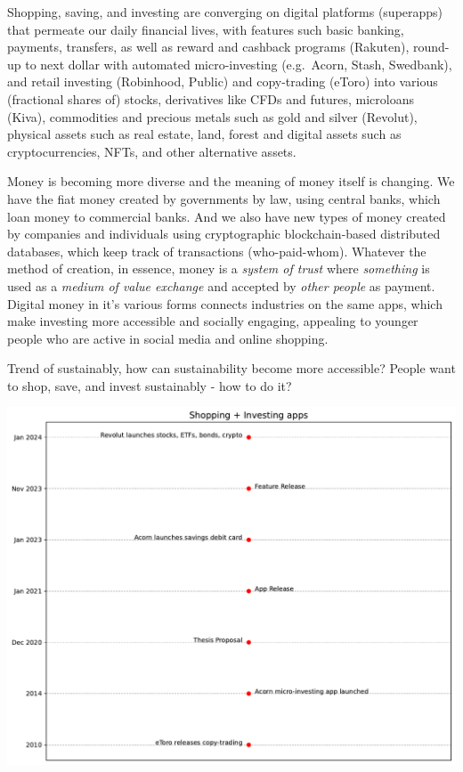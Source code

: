 \documentclass[
  letterpaper,
  DIV=11,
  numbers=noendperiod]{scrartcl}
\begin{document}
Shopping, saving, and investing are converging on digital platforms
(superapps) that permeate our daily financial lives, with features such
basic banking, payments, transfers, as well as reward and cashback
programs (Rakuten), round-up to next dollar with automated
micro-investing (e.g.~Acorn, Stash, Swedbank), and retail investing
(Robinhood, Public) and copy-trading (eToro) into various (fractional
shares of) stocks, derivatives like CFDs and futures, microloans (Kiva),
commodities and precious metals such as gold and silver (Revolut),
physical assets such as real estate, land, forest and digital assets
such as cryptocurrencies, NFTs, and other alternative assets.

Money is becoming more diverse and the meaning of money itself is
changing. We have the fiat money created by governments by law, using
central banks, which loan money to commercial banks. And we also have
new types of money created by companies and individuals using
cryptographic blockchain-based distributed databases, which keep track
of transactions (who-paid-whom). Whatever the method of creation, in
essence, money is a \emph{system of trust} where \emph{something} is
used as a \emph{medium of value exchange} and accepted by \emph{other
people} as payment. Digital money in it's various forms connects
industries on the same apps, which make investing more accessible and
socially engaging, appealing to younger people who are active in social
media and online shopping.

Trend of sustainably, how can sustainability become more accessible?
People want to shop, save, and invest sustainably - how to do it?

\includegraphics{_thesis_files/figure-pdf/cell-31-output-1.pdf}
\end{document}
